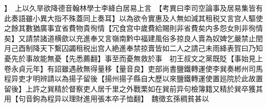 】　上以久旱欲降德音翰林學士李絳白居易上言　【考異曰李司空論事及居易集皆有此奏語雖小異大指不殊蓋同上奏耳】以為欲令實惠及人無如減其租税又言宫人驅使之餘其數猶廣事宜省費物貴徇情【冗食宫中歲費給賜則非省費矣内多怨女則非徇情矣】又請禁諸道横歛以充進奉又言嶺南黔中福建風俗多掠良人賣為奴婢乞嚴禁止閏月己酉制降天下繫囚蠲租税出宫人絶進奉禁掠賣皆如二人之請己未雨絳表賀曰乃知憂先於事故能無憂【先悉薦翻】事至而憂無救於事　初王叔文之黨既貶【事始見上卷永貞元年】有詔雖遇赦無得量移【量音良】吏部尚書鹽鐵轉運使李巽奏郴州司馬程异吏才明辨請以為揚子留後【揚州揚子縣自大歷以來鹽鐵轉運使置廵院於此故置留後】上許之巽精於督察吏人居千里之外戰栗如在巽前异句檢簿籍又精於巽卒獲其用【句音鉤為程异以理財進用張本卒子恤翻】　魏徵玄孫稠貧甚以